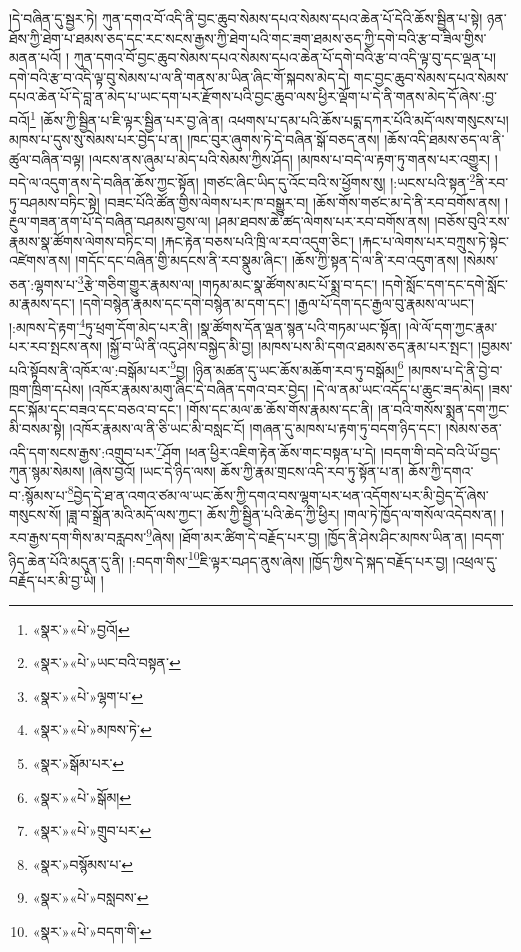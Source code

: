 །དེ་བཞིན་དུ་སྦྱར་ཏེ། ཀུན་དགའ་བོ་འདི་ནི་བྱང་ཆུབ་སེམས་དཔའ་སེམས་དཔའ་ཆེན་པོ་དེའི་ཆོས་སྦྱིན་པ་སྟེ། ཉན་ཐོས་ཀྱི་ཐེག་པ་ཐམས་ཅད་དང་རང་སངས་རྒྱས་ཀྱི་ཐེག་པའི་གང་ཟག་ཐམས་ཅད་ཀྱི་དགེ་བའི་རྩ་བ་ཟིལ་གྱིས་མནན་པའོ། །
ཀུན་དགའ་བོ་བྱང་ཆུབ་སེམས་དཔའ་སེམས་དཔའ་ཆེན་པོ་དགེ་བའི་རྩ་བ་འདི་ལྟ་བུ་དང་ལྡན་པ། དགེ་བའི་རྩ་བ་འདི་ལྟ་བུ་སེམས་པ་ལ་ནི་གནས་མ་ཡིན་ཞིང་གོ་སྐབས་མེད་དེ། གང་བྱང་ཆུབ་སེམས་དཔའ་སེམས་དཔའ་ཆེན་པོ་དེ་བླ་ན་མེད་པ་ཡང་དག་པར་རྫོགས་པའི་བྱང་ཆུབ་ལས་ཕྱིར་ལྡོག་པ་དེ་ནི་གནས་མེད་དོ་ཞེས་:བྱ་བའོ།\footnote{«སྣར་»«པེ་»བྱའོ།} །ཆོས་ཀྱི་སྦྱིན་པ་ཇི་ལྟར་སྦྱིན་པར་བྱ་ཞེ་ན། འཕགས་པ་དམ་པའི་ཆོས་པདྨ་དཀར་པོའི་མདོ་ལས་གསུངས་པ། མཁས་པ་དུས་སུ་སེམས་པར་བྱེད་པ་ན། །ཁང་བུར་ཞུགས་ཏེ་དེ་བཞིན་སྒོ་བཅད་ནས། །ཆོས་འདི་ཐམས་ཅད་ལ་ནི་ཚུལ་བཞིན་བལྟ། །ལངས་ནས་ཞུམ་པ་མེད་པའི་སེམས་ཀྱིས་ཤོད། །མཁས་པ་བདེ་ལ་རྟག་ཏུ་གནས་པར་འགྱུར། །བདེ་ལ་འདུག་ནས་དེ་བཞིན་ཆོས་ཀྱང་སྟོན། །གཙང་ཞིང་ཡིད་དུ་འོང་བའི་ས་ཕྱོགས་སུ། །:ཡངས་པའི་སྟན་\footnote{«སྣར་»«པེ་»ཡང་བའི་བསྟན་}ནི་རབ་ཏུ་བཤམས་བཏིང་སྟེ། །བཟང་པོའི་ཚོན་གྱིས་ལེགས་པར་ཁ་བསྒྱུར་བ། །ཆོས་གོས་གཙང་མ་དེ་ནི་རབ་བགོས་ནས། །རྔུལ་གཟན་ནག་པོ་དེ་བཞིན་བཤམས་བྱས་ལ། །ཤམ་ཐབས་ཆེ་ཚད་ལེགས་པར་རབ་བགོས་ནས། །བཅོས་བུའི་རས་རྣམས་སྣ་ཚོགས་ལེགས་བཏིང་བ། །རྐང་རྟེན་བཅས་པའི་ཁྲི་ལ་རབ་འདུག་ཅིང་། །རྐང་པ་ལེགས་པར་བཀྲུས་ཏེ་སྟེང་འཛེགས་ནས། །གདོང་དང་བཞིན་གྱི་མདངས་ནི་རབ་སྣུམ་ཞིང་། །ཆོས་ཀྱི་སྟན་དེ་ལ་ནི་རབ་འདུག་ནས། །སེམས་ཅན་:ལྷགས་པ་\footnote{«སྣར་»«པེ་»ལྷག་པ་}རྩེ་གཅིག་གྱུར་རྣམས་ལ། །གཏམ་མང་སྣ་ཚོགས་མང་པོ་སྨྲ་བ་དང་། །དགེ་སློང་དག་དང་དགེ་སློང་མ་རྣམས་དང་། །དགེ་བསྙེན་རྣམས་དང་དགེ་བསྙེན་མ་དག་དང་། །རྒྱལ་པོ་དག་དང་རྒྱལ་བུ་རྣམས་ལ་ཡང་། །:མཁས་དེ་རྟག་\footnote{«སྣར་»«པེ་»མཁས་ཏེ་}ཏུ་ཕྲག་དོག་མེད་པར་ནི། །སྣ་ཚོགས་དོན་ལྡན་སྙན་པའི་གཏམ་ཡང་སྟོན། །ལེ་ལོ་དག་ཀྱང་རྣམ་པར་རབ་སྤངས་ནས། །སྐྱོ་བ་ཡི་ནི་འདུ་ཤེས་བསྐྱེད་མི་བྱ། །མཁས་པས་མི་དགའ་ཐམས་ཅད་རྣམ་པར་སྤང་། །བྱམས་པའི་སྟོབས་ནི་འཁོར་ལ་:བསྒོམ་པར་\footnote{«སྣར་»སྒོམ་པར་}བྱ། །ཉིན་མཚན་དུ་ཡང་ཆོས་མཆོག་རབ་ཏུ་བསྒོམ།\footnote{«སྣར་»«པེ་»སྒོམ།} །མཁས་པ་དེ་ནི་བྱེ་བ་ཁྲག་ཁྲིག་དཔེས། །འཁོར་རྣམས་མགུ་ཞིང་དེ་བཞིན་དགའ་བར་བྱེད། །དེ་ལ་ནམ་ཡང་འདོད་པ་ཆུང་ཟད་མེད། །ཟས་དང་སྐོམ་དང་བཟའ་དང་བཅའ་བ་དང་། །གོས་དང་མལ་ཆ་ཆོས་གོས་རྣམས་དང་ནི། །ན་བའི་གསོས་སྨན་དག་ཀྱང་མི་བསམ་སྟེ། །འཁོར་རྣམས་ལ་ནི་ཅི་ཡང་མི་བསླང་ངོ། །གཞན་དུ་མཁས་པ་རྟག་ཏུ་བདག་ཉིད་དང་། །སེམས་ཅན་འདི་དག་སངས་རྒྱས་:འགྲུབ་པར་\footnote{«སྣར་»«པེ་»གྲུབ་པར་}ཤོག །ཕན་ཕྱིར་འཇིག་རྟེན་ཆོས་གང་བསྟན་པ་དེ། །བདག་གི་བདེ་བའི་ཡོ་བྱད་ཀུན་སྙམ་སེམས། །ཞེས་བྱའོ། །ཡང་དེ་ཉིད་ལས། ཆོས་ཀྱི་རྣམ་གྲངས་འདི་རབ་ཏུ་སྟོན་པ་ན། ཆོས་ཀྱི་དགའ་བ་:སྙོམས་པ་\footnote{«སྣར་»བསྙོམས་པ་}བྱེད་དེ་ཐ་ན་འགའ་ཙམ་ལ་ཡང་ཆོས་ཀྱི་དགའ་བས་ལྷག་པར་ཕན་འདོགས་པར་མི་བྱེད་དོ་ཞེས་གསུངས་སོ། །ཟླ་བ་སྒྲོན་མའི་མདོ་ལས་ཀྱང་། ཆོས་ཀྱི་སྦྱིན་པའི་ཆེད་ཀྱི་ཕྱིར། །གལ་ཏེ་ཁྱོད་ལ་གསོལ་འདེབས་ན། །རབ་རྒྱས་དག་གིས་མ་བརླབས་\footnote{«སྣར་»«པེ་»བསླབས་}ཞེས། །ཐོག་མར་ཚིག་དེ་བརྗོད་པར་བྱ། །ཁྱོད་ནི་ཤེས་ཤིང་མཁས་ཡིན་ན། །བདག་ཉིད་ཆེན་པོའི་མདུན་དུ་ནི། །:བདག་གིས་\footnote{«སྣར་»«པེ་»བདག་གི་}ཇི་ལྟར་བཤད་ནུས་ཞེས། །ཁྱོད་ཀྱིས་དེ་སྐད་བརྗོད་པར་བྱ། །འཕྲལ་དུ་བརྗོད་པར་མི་བྱ་ཡི། །
